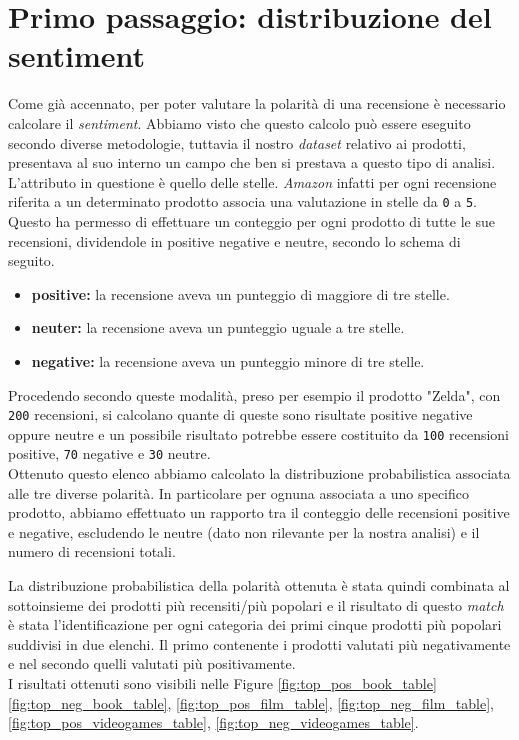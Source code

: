 	\section{Primo passaggio: distribuzione del sentiment}
		Come già accennato, per poter valutare la polarità di una recensione è necessario calcolare il \textit{sentiment}. Abbiamo visto che questo calcolo può essere eseguito secondo diverse metodologie, tuttavia il nostro \textit{dataset} relativo ai prodotti, presentava al suo interno un campo che ben si prestava a questo tipo di analisi. L'attributo in questione è quello delle stelle. \textit{Amazon} infatti per ogni recensione riferita a un determinato prodotto associa una valutazione in stelle da \verb|0| a \verb|5|. Questo ha permesso di effettuare un conteggio per ogni prodotto di tutte le sue recensioni, dividendole in positive negative e neutre, secondo lo schema di seguito.
			
		\begin{itemize}
			\item \textbf{positive:} la recensione aveva un punteggio di maggiore di tre stelle.
			\item \textbf{neuter:} la recensione aveva un punteggio uguale a tre stelle.
			\item \textbf{negative:} la recensione aveva un punteggio minore di tre stelle.
		\end{itemize}
			
		Procedendo secondo queste modalità, preso per esempio il prodotto "Zelda", con \verb|200| recensioni, si calcolano quante di queste sono risultate positive negative oppure neutre e un possibile risultato potrebbe essere costituito da \verb|100| recensioni positive, \verb|70| negative e \verb|30| neutre. \\		
		Ottenuto questo elenco abbiamo calcolato la distribuzione probabilistica associata alle tre diverse polarità. In particolare per ognuna associata a uno specifico prodotto, abbiamo effettuato un rapporto tra il conteggio delle recensioni positive e negative, escludendo le neutre (dato non rilevante per la nostra analisi) e il numero di recensioni totali. 
			
		La distribuzione probabilistica della polarità ottenuta è stata quindi combinata al sottoinsieme dei prodotti più recensiti/più popolari e il risultato di questo \textit{match} è stata l'identificazione per ogni categoria dei primi cinque prodotti più popolari suddivisi in due elenchi. Il primo contenente i prodotti valutati più negativamente e nel secondo quelli valutati più positivamente. \\
		I risultati ottenuti sono visibili nelle Figure \ref{fig:top_pos_book_table} \ref{fig:top_neg_book_table}, \ref{fig:top_pos_film_table}, \ref{fig:top_neg_film_table}, \ref{fig:top_pos_videogames_table}, \ref{fig:top_neg_videogames_table}.
			

